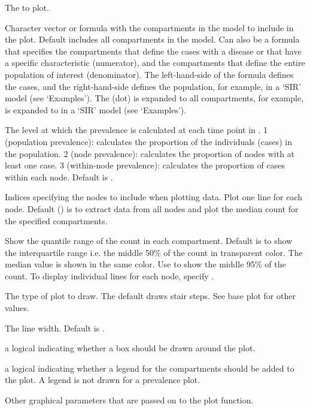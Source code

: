 \documentclass[letterpaper]{book}
\begin{document}
\begin{Arguments}
\begin{ldescription}
\item[\code{x}] The  to plot.

\item[\code{y}] Character vector or formula with the compartments in the
model to include in the plot. Default includes all
compartments in the model. Can also be a formula that
specifies the compartments that define the cases with a
disease or that have a specific characteristic (numerator),
and the compartments that define the entire population of
interest (denominator). The left-hand-side of the formula
defines the cases, and the right-hand-side defines the
population, for example,  in a `SIR'
model (see `Examples'). The   (dot) is expanded
to all compartments, for example,   is expanded to
 in a `SIR' model (see
`Examples').

\item[\code{level}] The level at which the prevalence is calculated at
each time point in . 1 (population prevalence):
calculates the proportion of the individuals (cases) in the
population. 2 (node prevalence): calculates the proportion of
nodes with at least one case. 3 (within-node prevalence):
calculates the proportion of cases within each node. Default
is .

\item[\code{index}] Indices specifying the nodes to include when plotting
data. Plot one line for each node. Default () is to extract data from all nodes and plot the median
count for the specified compartments.

\item[\code{range}] Show the quantile range of the count in each
compartment. Default is to show the interquartile range
i.e. the middle 50\% of the count in transparent color. The
median value is shown in the same color. Use  to show the middle 95\% of the count. To display
individual lines for each node, specify .

\item[\code{type}] The type of plot to draw. The default  draws stair steps. See base plot for other values.

\item[\code{lwd}] The line width. Default is .

\item[\code{frame.plot}] a logical indicating whether a box should be
drawn around the plot.

\item[\code{legend}] a logical indicating whether a legend for the
compartments should be added to the plot. A legend is not
drawn for a prevalence plot.

\item[\code{...}] Other graphical parameters that are passed on to the
plot function.
\end{ldescription}
\end{Arguments}
\end{document}
